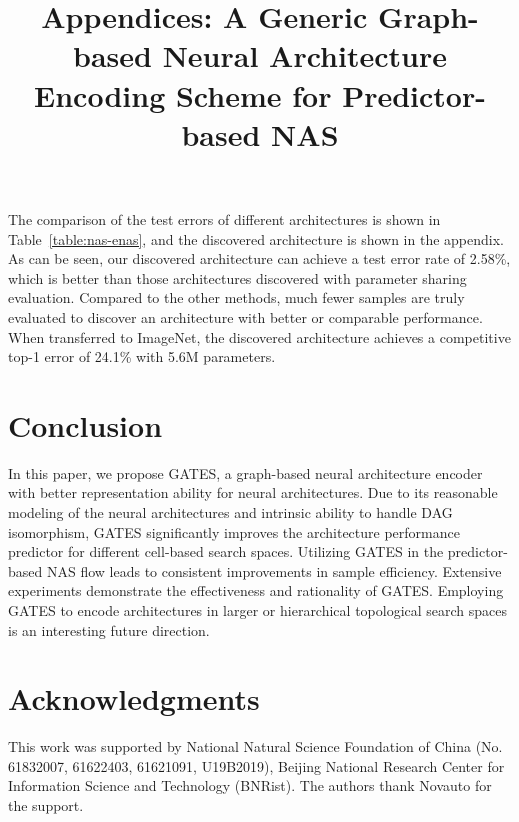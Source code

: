 \documentclass[runningheads]{llncs}
\begin{document}
The comparison of the test errors of different architectures is shown in Table~\ref{table:nas-enas}, and the discovered architecture is shown in the appendix. As can be seen, our discovered architecture can achieve a
test error rate of 2.58\%, which is better than those architectures discovered with parameter sharing evaluation. Compared to the other methods, much fewer samples are truly evaluated to discover an architecture with better or comparable performance. When transferred to ImageNet, the discovered architecture achieves a competitive top-1 error of 24.1\% with 5.6M parameters.



\section{Conclusion}
\label{sec:conclusion}
In this paper, we propose GATES, a graph-based neural architecture encoder with better representation ability for neural architectures. Due to its reasonable modeling of the neural architectures and intrinsic ability to handle DAG isomorphism, GATES significantly improves the architecture performance predictor for different cell-based search spaces. Utilizing GATES in the predictor-based NAS flow leads to consistent improvements in sample efficiency. Extensive experiments demonstrate the effectiveness and rationality of GATES. Employing GATES to encode architectures in larger or hierarchical topological search spaces is an interesting future direction.


\section*{Acknowledgments}
This work was supported by National Natural Science Foundation of China (No. 61832007, 61622403, 61621091, U19B2019), Beijing National Research Center for Information Science and Technology (BNRist). The authors thank Novauto for the support.

\clearpage




\pagestyle{headings}

\title{Appendices: A Generic Graph-based Neural Architecture Encoding Scheme for Predictor-based NAS}

\author{}
\institute{}
\email{}



\maketitle
\end{document}

